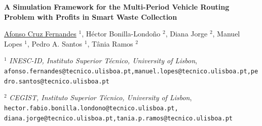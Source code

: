 \documentclass[9pt,a4paper]{book}
\newcommand{\paperTitle}[1]{%
	\medskip
	\Large \textbf{#1}\par
	\bigskip
    \bigskip
}
\newcommand{\presenterName}[1]{%
	\small \noindent
	\underline{#1}
}
\newcommand{\presenterAffiliation}[2]{%
	\footnotesize \emph{#1}, \nolinkurl{#2} \par
	\smallskip
}
\newcommand{\coAuthorName}[1]{%
	\small \noindent
	#1
}
\newcommand{\coAuthorAffiliation}[2]{%
	\footnotesize \emph{#1}, \nolinkurl{#2} \par
	\smallskip
}
\begin{document}
\begin{center}
\paperTitle{A Simulation Framework for the Multi-Period Vehicle Routing Problem with Profits in Smart Waste Collection}
\presenterName{Afonso Cruz Fernandes}$^{1}$, \coAuthorName{Héctor Bonilla-Londoño}$^2$,
\coAuthorName{Diana Jorge}$^2$,
\coAuthorName{Manuel Lopes}$^1$,
\coAuthorName{Pedro A. Santos}$^1$,
\coAuthorName{Tânia Ramos}$^2$

\medskip

$^{1}$\presenterAffiliation{INESC-ID, Instituto Superior Técnico, University of Lisbon}{afonso.fernandes@tecnico.ulisboa.pt,manuel.lopes@tecnico.ulisboa.pt,pedro.santos@tecnico.ulisboa.pt}

$^{2}$\coAuthorAffiliation{CEGIST, Instituto Superior Técnico, University of Lisbon}{hector.fabio.bonilla.londono@tecnico.ulisboa.pt, diana.jorge@tecnico.ulisboa.pt,tania.p.ramos@tecnico.ulisboa.pt}




\end{center}
\end{document}
